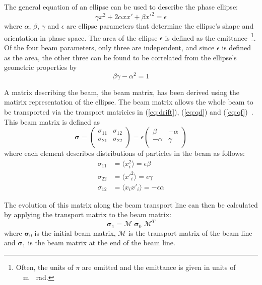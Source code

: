 
The general equation of an ellipse can be used to describe the phase ellipse:
\begin{equation}
	\gamma x^2 + 2\alpha xx' + \beta x'^2 = \epsilon
\end{equation}
where \(\alpha\),  \(\beta\), \(\gamma\) and \(\epsilon\) are ellipse parameters
that determine the ellipse's shape and orientation in phase space.  The area of
the ellipse \(\epsilon\) is defined as the emittance~\footnote{Often, the units
of \(\pi\) are omitted and the emittance is given in units of
\si{\pi\;\meter\;\radian}.}. Of the four beam parameters, only three are
independent, and since \(\epsilon\) is defined as the area, the other three can
be found to be correlated from the ellipse's geometric properties by
\begin{equation}
	\beta\gamma - \alpha^2 = 1
\end{equation}

A matrix describing the beam, the beam matrix, has been derived using the
matirix representation of the ellipse. The beam matrix allows the whole beam to
be transported via the transport matricies in (\ref{eq:drift}), (\ref{eq:qd})
and (\ref{eq:qf})~\cite{wiedemann2007particle}. This beam matrix is defined as
\begin{equation}
	\bm{\sigma} =
	\begin{pmatrix}
		\sigma_{11} & \sigma_{12} \\
		\sigma_{21} & \sigma_{22} \\
	\end{pmatrix}
	=
	\epsilon
	\begin{pmatrix}
		\beta & -\alpha \\
		-\alpha & \gamma \\
	\end{pmatrix}
\end{equation}
where each element describes distributions of particles in the beam as follows:
\begin{align}
	\sigma_{11} &= \langle x_i^2 \rangle = \epsilon\beta \\
	\sigma_{22} &= \langle {x'}_i^2 \rangle = \epsilon\gamma \\
	\sigma_{12} &= \langle x_i x'_i \rangle = -\epsilon\alpha
\end{align}

The evolution of this matrix along the beam transport line can then be
calculated by applying the transport matrix to the beam matrix:
\begin{equation}
	\bm{\sigma}_1 = \mathcal{M}\;\bm{\sigma}_0\;\mathcal{M}^T
	\label{eq:apply}
\end{equation}
where \(\bm{\sigma}_0\) is the initial beam matrix, \(\mathcal{M}\) is the
transport matrix of the beam line and \(\bm{\sigma}_1\) is the beam matrix at
the end of the beam line.

